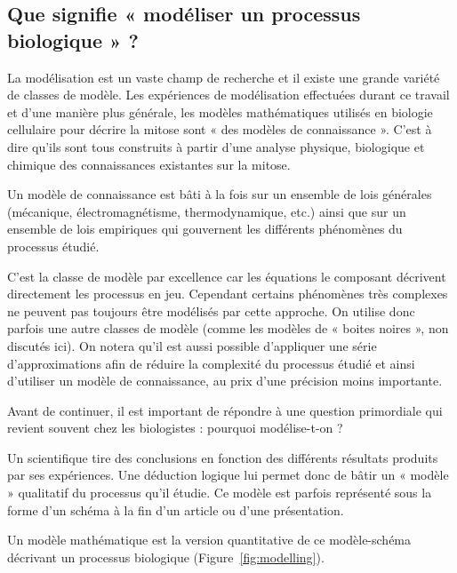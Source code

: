 \documentclass[12pt,a4paper,twoside,openright]{book}
\begin{document}
\subsection{Que signifie « modéliser un processus biologique »
?}\label{que-signifie-moduxe9liser-un-processus-biologique}

La modélisation est un vaste champ de recherche et il existe une grande
variété de classes de modèle. Les expériences de modélisation effectuées
durant ce travail et d'une manière plus générale, les modèles
mathématiques utilisés en biologie cellulaire pour décrire la mitose
sont « des modèles de connaissance ». C'est à dire qu'ils sont tous
construits à partir d'une analyse physique, biologique et chimique des
connaissances existantes sur la mitose.

Un modèle de connaissance est bâti à la fois sur un ensemble de lois
générales (mécanique, électromagnétisme, thermodynamique, etc.) ainsi
que sur un ensemble de lois empiriques qui gouvernent les différents
phénomènes du processus étudié.

C'est la classe de modèle par excellence car les équations le composant
décrivent directement les processus en jeu. Cependant certains
phénomènes très complexes ne peuvent pas toujours être modélisés par
cette approche. On utilise donc parfois une autre classes de modèle
(comme les modèles de « boites noires », non discutés ici). On notera
qu'il est aussi possible d'appliquer une série d'approximations afin de
réduire la complexité du processus étudié et ainsi d'utiliser un modèle
de connaissance, au prix d'une précision moins importante.

Avant de continuer, il est important de répondre à une question
primordiale qui revient souvent chez les biologistes : pourquoi
modélise-t-on ?

Un scientifique tire des conclusions en fonction des différents
résultats produits par ses expériences. Une déduction logique lui permet
donc de bâtir un « modèle » qualitatif du processus qu'il étudie. Ce
modèle est parfois représenté sous la forme d'un schéma à la fin d'un
article ou d'une présentation.

Un modèle mathématique est la version quantitative de ce modèle-schéma
décrivant un processus biologique (Figure~\ref{fig:modelling}).
\end{document}
